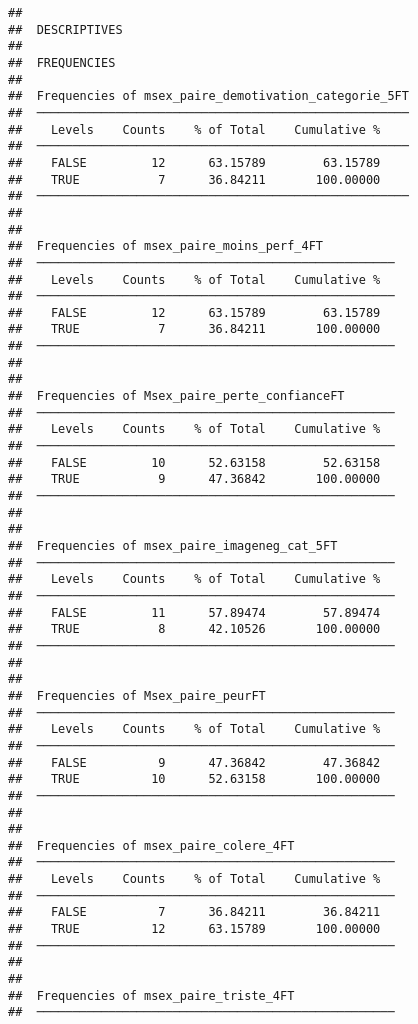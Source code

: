 \documentclass[
]{article}
\begin{document}
\begin{verbatim}
## 
##  DESCRIPTIVES
## 
##  FREQUENCIES
## 
##  Frequencies of msex_paire_demotivation_categorie_5FT 
##  ──────────────────────────────────────────────────── 
##    Levels    Counts    % of Total    Cumulative %   
##  ──────────────────────────────────────────────────── 
##    FALSE         12      63.15789        63.15789   
##    TRUE           7      36.84211       100.00000   
##  ──────────────────────────────────────────────────── 
## 
## 
##  Frequencies of msex_paire_moins_perf_4FT           
##  ────────────────────────────────────────────────── 
##    Levels    Counts    % of Total    Cumulative %   
##  ────────────────────────────────────────────────── 
##    FALSE         12      63.15789        63.15789   
##    TRUE           7      36.84211       100.00000   
##  ────────────────────────────────────────────────── 
## 
## 
##  Frequencies of Msex_paire_perte_confianceFT        
##  ────────────────────────────────────────────────── 
##    Levels    Counts    % of Total    Cumulative %   
##  ────────────────────────────────────────────────── 
##    FALSE         10      52.63158        52.63158   
##    TRUE           9      47.36842       100.00000   
##  ────────────────────────────────────────────────── 
## 
## 
##  Frequencies of msex_paire_imageneg_cat_5FT         
##  ────────────────────────────────────────────────── 
##    Levels    Counts    % of Total    Cumulative %   
##  ────────────────────────────────────────────────── 
##    FALSE         11      57.89474        57.89474   
##    TRUE           8      42.10526       100.00000   
##  ────────────────────────────────────────────────── 
## 
## 
##  Frequencies of Msex_paire_peurFT                   
##  ────────────────────────────────────────────────── 
##    Levels    Counts    % of Total    Cumulative %   
##  ────────────────────────────────────────────────── 
##    FALSE          9      47.36842        47.36842   
##    TRUE          10      52.63158       100.00000   
##  ────────────────────────────────────────────────── 
## 
## 
##  Frequencies of msex_paire_colere_4FT               
##  ────────────────────────────────────────────────── 
##    Levels    Counts    % of Total    Cumulative %   
##  ────────────────────────────────────────────────── 
##    FALSE          7      36.84211        36.84211   
##    TRUE          12      63.15789       100.00000   
##  ────────────────────────────────────────────────── 
## 
## 
##  Frequencies of msex_paire_triste_4FT               
##  ────────────────────────────────────────────────── 

\end{verbatim}
\end{document}
